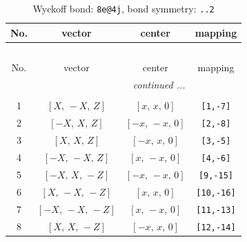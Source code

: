 \documentclass[fleqn,8pt]{jsarticle}
\begin{document}
\begin{longtable}{cccc}
\caption{Wyckoff bond: {\tt 8e@4j}, bond symmetry: {\tt ..2}}
 \\
 \hline \hline
No. & vector & center & mapping \\ \hline \endfirsthead

\multicolumn{3}{l}{\tablename\ \thetable{}} \\
 \hline \hline
No. & vector & center & mapping \\ \hline \endhead

 \hline \hline
\multicolumn{3}{r}{\footnotesize\it continued ...} \\ \endfoot

 \hline \hline
\multicolumn{3}{r}{} \\ \endlastfoot

1 & $\left[ X,\, - X,\, Z \right]$ & $\left[ x,\, x,\, 0 \right]$ & {\tt [1,-7]} \\ \hline
2 & $\left[ - X,\, X,\, Z \right]$ & $\left[ - x,\, - x,\, 0 \right]$ & {\tt [2,-8]} \\ \hline
3 & $\left[ X,\, X,\, Z \right]$ & $\left[ - x,\, x,\, 0 \right]$ & {\tt [3,-5]} \\ \hline
4 & $\left[ - X,\, - X,\, Z \right]$ & $\left[ x,\, - x,\, 0 \right]$ & {\tt [4,-6]} \\ \hline
5 & $\left[ - X,\, X,\, - Z \right]$ & $\left[ - x,\, - x,\, 0 \right]$ & {\tt [9,-15]} \\ \hline
6 & $\left[ X,\, - X,\, - Z \right]$ & $\left[ x,\, x,\, 0 \right]$ & {\tt [10,-16]} \\ \hline
7 & $\left[ - X,\, - X,\, - Z \right]$ & $\left[ x,\, - x,\, 0 \right]$ & {\tt [11,-13]} \\ \hline
8 & $\left[ X,\, X,\, - Z \right]$ & $\left[ - x,\, x,\, 0 \right]$ & {\tt [12,-14]} \\
\end{longtable}
\renewcommand{\arraystretch}{1.2}
\end{document}
